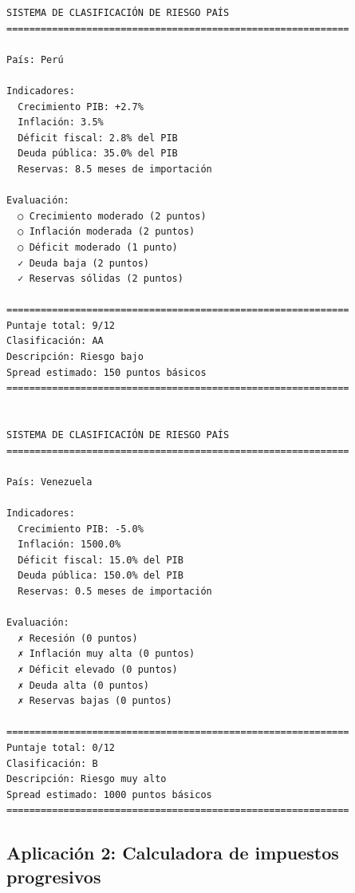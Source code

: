 \documentclass[
  doc,
  floatsintext,
  longtable,
  a4paper,
  nolmodern,
  notxfonts,
  notimes,
  12pt,
  colorlinks=true,linkcolor=blue,citecolor=blue,urlcolor=blue]{apa7}
\begin{document}
\begin{verbatim}
SISTEMA DE CLASIFICACIÓN DE RIESGO PAÍS
============================================================

País: Perú

Indicadores:
  Crecimiento PIB: +2.7%
  Inflación: 3.5%
  Déficit fiscal: 2.8% del PIB
  Deuda pública: 35.0% del PIB
  Reservas: 8.5 meses de importación

Evaluación:
  ○ Crecimiento moderado (2 puntos)
  ○ Inflación moderada (2 puntos)
  ○ Déficit moderado (1 punto)
  ✓ Deuda baja (2 puntos)
  ✓ Reservas sólidas (2 puntos)

============================================================
Puntaje total: 9/12
Clasificación: AA
Descripción: Riesgo bajo
Spread estimado: 150 puntos básicos
============================================================


SISTEMA DE CLASIFICACIÓN DE RIESGO PAÍS
============================================================

País: Venezuela

Indicadores:
  Crecimiento PIB: -5.0%
  Inflación: 1500.0%
  Déficit fiscal: 15.0% del PIB
  Deuda pública: 150.0% del PIB
  Reservas: 0.5 meses de importación

Evaluación:
  ✗ Recesión (0 puntos)
  ✗ Inflación muy alta (0 puntos)
  ✗ Déficit elevado (0 puntos)
  ✗ Deuda alta (0 puntos)
  ✗ Reservas bajas (0 puntos)

============================================================
Puntaje total: 0/12
Clasificación: B
Descripción: Riesgo muy alto
Spread estimado: 1000 puntos básicos
============================================================
\end{verbatim}

\subsection{Aplicación 2: Calculadora de impuestos
progresivos}\label{aplicaciuxf3n-2-calculadora-de-impuestos-progresivos}
\end{document}
